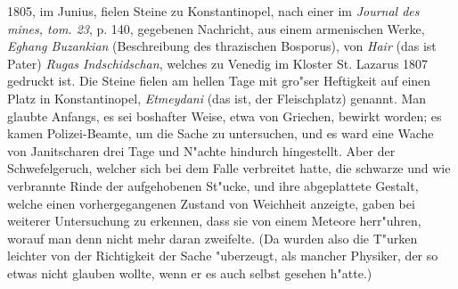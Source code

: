 \documentclass[a4paper, 11pt, oneside, polutonikogreek, german]{article}
\begin{document}
1805, im Junius, fielen Steine zu Konstantinopel, nach einer im \emph{Journal des mines, tom. 23}, p. 140, gegebenen Nachricht, aus einem armenischen Werke, \emph{Eghang Buzankian} (Beschreibung des thrazischen Bosporus), von \emph{Hair} (das ist Pater) \emph{Rugas Indschidschan}, welches zu Venedig im Kloster St. Lazarus 1807 gedruckt ist. Die Steine fielen am hellen Tage mit gro"ser Heftigkeit auf einen Platz in Konstantinopel, \emph{Etmeydani} (das ist, der Fleischplatz) genannt. Man glaubte Anfangs, es sei boshafter Weise, etwa von Griechen, bewirkt worden; es kamen Polizei-Beamte, um die Sache zu untersuchen, und es ward eine Wache von Janitscharen drei Tage und N"achte hindurch hingestellt. Aber der Schwefelgeruch, welcher sich bei dem Falle verbreitet hatte, die schwarze und wie verbrannte Rinde der aufgehobenen St"ucke, und ihre abgeplattete Gestalt, welche einen vorhergegangenen Zustand von Weichheit anzeigte, gaben bei weiterer Untersuchung zu erkennen, dass sie von einem Meteore herr"uhren, worauf man denn nicht mehr daran zweifelte. (Da wurden also die T"urken leichter von der Richtigkeit der Sache "uberzeugt, als mancher Physiker, der so etwas nicht glauben wollte, wenn er es auch selbst gesehen h"atte.)
\end{document}

